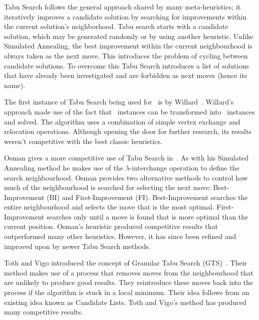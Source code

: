 Tabu Search follows the general approach shared by many meta-heuristics; it iteratively improves a candidate solution by searching for improvements within the current solution's neighborhood. Tabu search starts with a candidate solution, which may be generated randomly or by using another heuristic. Unlike Simulated Annealing, the best improvement within the current neighbourhood is always taken as the next move. This introduces the problem of cycling between candidate solutions. To overcome this Tabu Search introduces a list of solutions that have already been investigated and are forbidden as next moves (hence its name).

The first instance of Tabu Search being used for \VRP\ is by Willard~\cite{Willard:1989}. Willard's approach made use of the fact that \VRP\ instances can be transformed into \MTSP\ instances and solved. The algorithm uses a combination of simple vertex exchange and relocation operations. Although opening the door for further research, its results weren't competitive with the best classic heuristics. 

Osman gives a more competitive use of Tabu Search in~\cite{Osman:1993}. As with his Simulated Annealing method he makes use of the $\lambda$-interchange operation to define the search neighbourhood. Osman provides two alternative methods to control how much of the neighbourhood is searched for selecting the next move: Best-Improvement (BI) and First-Improvement (FI). Best-Improvement searches the entire neighbourhood and selects the move that is the most optimal. First-Improvement searches only until a move is found that is more optimal than the current position. Osman's heuristic produced competitive results that outperformed many other heuristics. However, it has since been refined and improved upon by newer Tabu Search methods.

Toth and Vigo introduced the concept of Granular Tabu Search (GTS)~\cite{GHL:1998}. Their method makes use of a process that removes moves from the neighbourhood that are unlikely to produce good results. They reintroduce these moves back into the process if the algorithm is stuck in a local minimum. Their idea follows from an existing idea known as Candidate Lists. Toth and Vigo's method has produced many competitive results.

